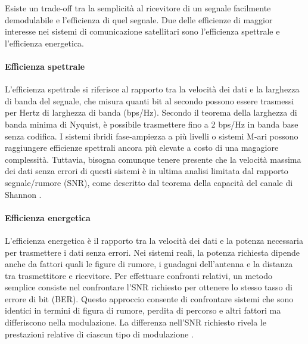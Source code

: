 Esiste un trade-off tra la semplicità al ricevitore di un segnale facilmente demodulabile e l'efficienza di quel segnale.
Due delle efficienze di maggior interesse nei sistemi di comunicazione satellitari sono l'efficienza spettrale e l'efficienza energetica.

\paragraph{Efficienza spettrale}
L'efficienza spettrale si riferisce al rapporto tra la velocità dei dati e la larghezza di banda del segnale, che misura quanti bit al secondo possono essere trasmessi per Hertz di larghezza di banda (bps/Hz).
Secondo il teorema della larghezza di banda minima di Nyquist, è possibile trasmettere fino a 2 bps/Hz in banda base senza codifica.
I sistemi ibridi fase-ampiezza a più livelli o sistemi M-ari possono raggiungere efficienze spettrali ancora più elevate a costo di una magagiore complessità. Tuttavia, bisogna comunque tenere presente che la velocità massima dei dati senza errori di questi sistemi è in ultima analisi limitata dal rapporto segnale/rumore (\ac{SNR}), come descritto dal teorema della capacità del canale di Shannon \cite{don_k_lefevre_power-efficient_1989}.

\paragraph{Efficienza energetica}
L'efficienza energetica è il rapporto tra la velocità dei dati e la potenza necessaria per trasmettere i dati senza errori.
Nei sistemi reali, la potenza richiesta dipende anche da fattori quali le figure di rumore, i guadagni dell'antenna e la distanza tra trasmettitore e ricevitore.
Per effettuare confronti relativi, un metodo semplice consiste nel confrontare l'\ac{SNR} richiesto per ottenere lo stesso tasso di errore di bit (\ac{BER}).
Questo approccio consente di confrontare sistemi che sono identici in termini di figura di rumore, perdita di percorso e altri fattori ma differiscono nella modulazione.
La differenza nell'SNR richiesto rivela le prestazioni relative di ciascun tipo di modulazione \cite{don_k_lefevre_power-efficient_1989}.

